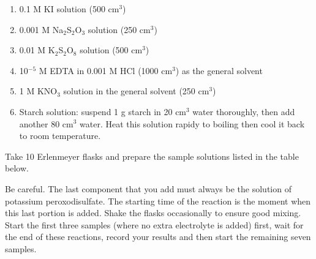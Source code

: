 \begin{enumerate}

\item  0.1 M KI solution (500 cm$^3$)

\item  0.001 M Na$_2$S$_2$O$_3$ solution (250 cm$^3$)

\item 0.01 M K$_2$S$_2$O$_8$ solution (500 cm$^3$)

\item 10$^{-5}$ M EDTA in 0.001 M HCl (1000 cm$^3$) as the general solvent

\item 1 M KNO$_3$ solution in the general solvent  (250 cm$^3$)

\item Starch solution: suspend 1 g starch in 20 cm$^3$ water thoroughly, then add another 80 cm$^3$ water. Heat this solution rapidy to boiling then cool it back to room temperature. 

\end{enumerate}

Take 10 Erlenmeyer flasks and prepare the sample solutions listed in the table below.

Be careful. The last component that you add must always be the solution of potassium peroxodisulfate. The starting time of the reaction is the moment when this last portion is added. Shake the flasks occasionally to ensure good mixing. Start the first three samples (where no extra electrolyte is added) first, wait for the end of these reactions, record your results and then start the remaining seven samples.



